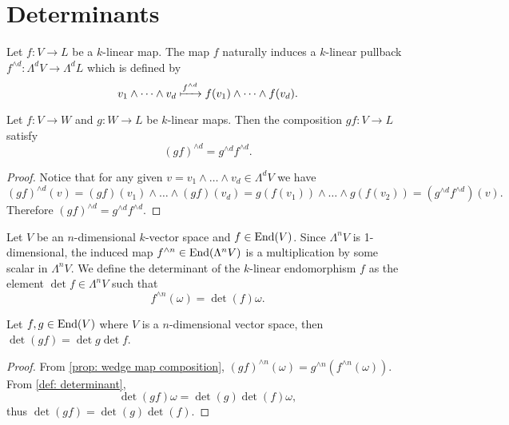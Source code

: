 \section{Determinants}

\begin{definition}\label{def: wedge map}
Let \(f: V \to L\) be a \(k\)-linear map. The map \(f\) naturally induces a
\(k\)-linear pullback \(f^{\wedge d}: \Lambda^d V \to \Lambda^d L\) which is
defined by
\[
  v_1 \wedge \dots \wedge v_d \xmapsto{f^{\wedge d}}
  f(v_1) \wedge \dots \wedge f(v_d).
\]
\end{definition}

\begin{proposition}\label{prop: wedge map composition}
Let \(f: V \to W\) and \(g: W \to L\) be \(k\)-linear maps. Then the
composition \(g f: V \to L\) satisfy
\[
  (g f)^{\wedge d} = g^{\wedge d} f^{\wedge d}.
\]
\end{proposition}

\begin{proof}
Notice that for any given \(v = v_1 \wedge \dots \wedge v_d \in \Lambda^d V\)
we have
\[
  (g f)^{\wedge d}(v) = (g f) (v_1) \wedge \dots \wedge (g f) (v_d)
  = g(f(v_1)) \wedge \dots \wedge g(f(v_2))
  = (g^{\wedge d} f^{\wedge d})(v).
\]
Therefore \((g f)^{\wedge d} = g^{\wedge d} f^{\wedge d}\).
\end{proof}

\begin{definition}[Determinant]\label{def: determinant}
Let \(V\) be an \(n\)-dimensional \(k\)-vector space and \(f \in \operatorname{End}(V)\).
Since \(\Lambda^n V\) is 1-dimensional, the induced map \(f^{\wedge n}
\in \operatorname{End}(\Lambda^n V)\) is a multiplication by some scalar in
\(\Lambda^n V\).  We define the determinant of the \(k\)-linear endomorphism
\(f\) as the element \(\det f \in \Lambda^n V\) such that
\[
  f^{\wedge n}(\omega) = \det(f) \omega.
\]
\end{definition}

\begin{proposition}\label{prop: comp det}
Let \(f, g \in \operatorname{End}(V)\) where \(V\) is a \(n\)-dimensional vector space, then
\(\det(g f) = \det g \det f\).
\end{proposition}

\begin{proof}
From \cref{prop: wedge map composition}, \((g f)^{\wedge n}(\omega) =
g^{\wedge n}(f^{\wedge n}(\omega))\). From \cref{def: determinant},
\[
  \det(g f) \omega = \det(g) \det(f) \omega,
\]
thus \(\det(g f) = \det(g) \det(f)\).
\end{proof}

